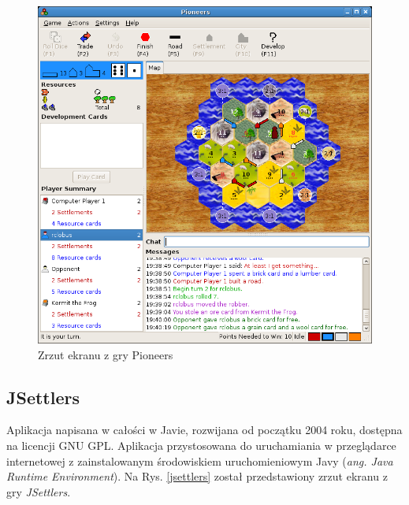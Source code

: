 \documentclass[a4paper,12pt]{article}
\providecommand{\imref}[1]{Rys. \ref{#1}} %
\begin{document}
\begin{figure}[ht]
  \begin{center}
    \includegraphics[width=\linewidth]{pioneers.png}
  \end{center}
  \caption{Zrzut ekranu z gry Pioneers}
  \label{pioneers}
\end{figure}

\subsection{JSettlers}
Aplikacja napisana w całości w Javie, rozwijana od początku 2004 roku,
dostępna na licencji GNU GPL\cite{jsettlers}. Aplikacja przystosowana
do uruchamiania w przeglądarce internetowej z zainstalowanym
środowiskiem uruchomieniowym Javy (\emph{ang. Java Runtime
  Environment}). Na \imref{jsettlers} został przedstawiony zrzut
ekranu z gry \emph{JSettlers}.
\end{document}
